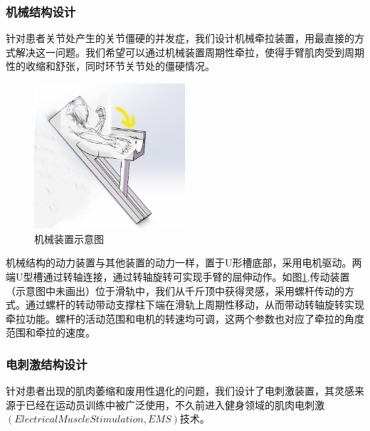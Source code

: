\documentclass[UTF8]{ctexart}
\begin{document}
        \subsubsection{机械结构设计}
            针对患者关节处产生的关节僵硬的并发症，我们设计机械牵拉装置，用最直接的方式解决这一问题。我们希望可以通过机械装置周期性牵拉，使得手臂肌肉受到周期性的收缩和舒张，同时环节关节处的僵硬情况。
            \begin{figure}[H]
                \centering
                \includegraphics[width=0.5\textwidth]{Machine.png}
                \caption{机械装置示意图}
                \label{fig:Machine}
            \end{figure}

            机械结构的动力装置与其他装置的动力一样，置于U形槽底部，采用电机驱动。两端U型槽通过转轴连接，通过转轴旋转可实现手臂的屈伸动作。如图\ref{fig:Machine},传动装置（示意图中未画出）位于滑轨中，我们从千斤顶中获得灵感，采用螺杆传动的方式。通过螺杆的转动带动支撑柱下端在滑轨上周期性移动，从而带动转轴旋转实现牵拉功能。螺杆的活动范围和电机的转速均可调，这两个参数也对应了牵拉的角度范围和牵拉的速度。
        \subsubsection{电刺激结构设计}
            针对患者出现的肌肉萎缩和废用性退化的问题，我们设计了电刺激装置，其灵感来源于已经在运动员训练中被广泛使用，不久前进入健身领域的肌肉电刺激$(Electrical Muscle Stimulation,EMS)$技术。\cite{wiki}
\end{document}
